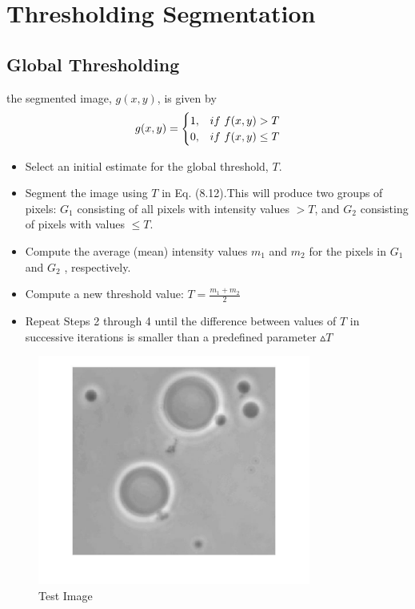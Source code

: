 \documentclass[11pt,oneside]{book}
\begin{document}
\section{Thresholding Segmentation}

\subsection{Global Thresholding}
the segmented image, $g(x, y)$, is given by
\begin{eqnarray}g(x,y)=
\begin{cases}
1, &if\ f(x, y)>T \cr 0,&if\ f(x,y)\le T\end{cases}
\end{eqnarray}
\begin{itemize}
  \item Select an initial estimate for the global threshold, $T$.
  \item Segment the image using $T$ in Eq. (8.12).This will produce two groups of pixels: $G_1$ consisting of all pixels with intensity values $>T$, and $G_2$ consisting of pixels with values $\le T$.
  \item Compute the average (mean) intensity values $m_1$ and $m_2$ for the pixels in $G_1$ and $G_2$ , respectively.
  \item Compute a new threshold value: $T=\frac{m_1+m_2}{2}$
  \item Repeat Steps 2 through 4 until the difference between values of $T$ in successive iterations is smaller than a predefined parameter $\vartriangle T$
\end{itemize}
\newpage
\begin{figure}[!htb]
   \centering  
   \includegraphics[width=0.8\textwidth]{images/9/image2.jpg}
   \caption{Test Image}
\end{figure}
\end{document}
